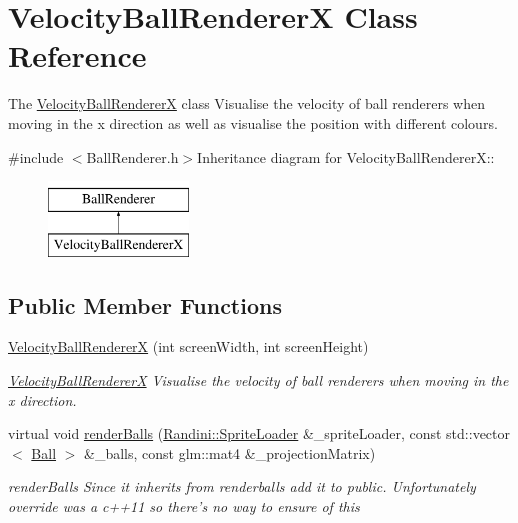 \hypertarget{classVelocityBallRendererX}{
\section{VelocityBallRendererX Class Reference}
\label{classVelocityBallRendererX}
}


The \hyperlink{classVelocityBallRendererX}{VelocityBallRendererX} class Visualise the velocity of ball renderers when moving in the x direction as well as visualise the position with different colours.  


{\ttfamily \#include $<$BallRenderer.h$>$}Inheritance diagram for VelocityBallRendererX::\begin{figure}[H]
\begin{center}
\leavevmode
\includegraphics[height=2cm]{classVelocityBallRendererX}
\end{center}
\end{figure}
\subsection*{Public Member Functions}
\begin{DoxyCompactItemize}
\item 
\hyperlink{classVelocityBallRendererX_ad3ae42e2ab2efab70a9812267eb337a7}{VelocityBallRendererX} (int screenWidth, int screenHeight)
\begin{DoxyCompactList}\small\item\em \hyperlink{classVelocityBallRendererX}{VelocityBallRendererX} Visualise the velocity of ball renderers when moving in the x direction. \item\end{DoxyCompactList}\item 
virtual void \hyperlink{classVelocityBallRendererX_a36057cc32c5310d711373697acaefec6}{renderBalls} (\hyperlink{classRandini_1_1SpriteLoader}{Randini::SpriteLoader} \&\_\-spriteLoader, const std::vector$<$ \hyperlink{structBall}{Ball} $>$ \&\_\-balls, const glm::mat4 \&\_\-projectionMatrix)
\begin{DoxyCompactList}\small\item\em renderBalls Since it inherits from renderballs add it to public. Unfortunately override was a c++11 so there's no way to ensure of this \item\end{DoxyCompactList}\end{DoxyCompactItemize}



